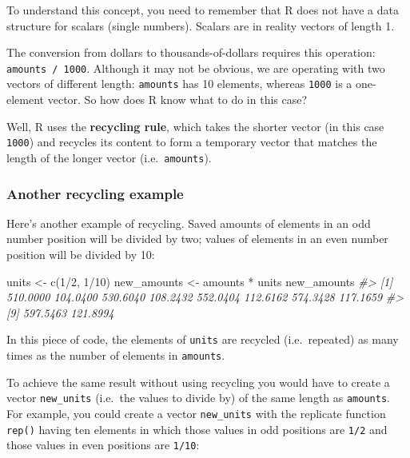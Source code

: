 \documentclass[
]{book}
\newenvironment{Shaded}{\begin{snugshade}}{\end{snugshade}}
\newcommand{\CommentTok}[1]{\textcolor[rgb]{0.56,0.35,0.01}{\textit{#1}}}
\newcommand{\DecValTok}[1]{\textcolor[rgb]{0.00,0.00,0.81}{#1}}
\newcommand{\FunctionTok}[1]{\textcolor[rgb]{0.00,0.00,0.00}{#1}}
\newcommand{\NormalTok}[1]{#1}
\newcommand{\OtherTok}[1]{\textcolor[rgb]{0.56,0.35,0.01}{#1}}
\newcommand{\SpecialCharTok}[1]{\textcolor[rgb]{0.00,0.00,0.00}{#1}}
\begin{document}
To understand this concept, you need to remember that R does not have a data
structure for scalars (single numbers). Scalars are in reality vectors of
length 1.

The conversion from dollars to thousands-of-dollars requires this operation:
\texttt{amounts\ /\ 1000}. Although it may not be obvious, we are operating with two
vectors of different length: \texttt{amounts} has 10 elements, whereas \texttt{1000} is a
one-element vector. So how does R know what to do in this case?

Well, R uses the \textbf{recycling rule}, which takes the shorter vector (in this
case \texttt{1000}) and recycles its content to form a temporary vector that matches
the length of the longer vector (i.e.~\texttt{amounts}).

\hypertarget{another-recycling-example}{%
\subsubsection*{Another recycling example}\label{another-recycling-example}}

Here's another example of recycling. Saved amounts of elements in an odd
number position will be divided by two; values of elements in an even
number position will be divided by 10:

\begin{Shaded}
\begin{Highlighting}[]
\NormalTok{units }\OtherTok{\textless{}{-}} \FunctionTok{c}\NormalTok{(}\DecValTok{1}\SpecialCharTok{/}\DecValTok{2}\NormalTok{, }\DecValTok{1}\SpecialCharTok{/}\DecValTok{10}\NormalTok{)}
\NormalTok{new\_amounts }\OtherTok{\textless{}{-}}\NormalTok{ amounts }\SpecialCharTok{*}\NormalTok{ units}
\NormalTok{new\_amounts}
\CommentTok{\#\textgreater{}  [1] 510.0000 104.0400 530.6040 108.2432 552.0404 112.6162 574.3428 117.1659}
\CommentTok{\#\textgreater{}  [9] 597.5463 121.8994}
\end{Highlighting}
\end{Shaded}

In this piece of code, the elements of \texttt{units} are recycled (i.e.~repeated) as
many times as the number of elements in \texttt{amounts}.

To achieve the same result without using recycling you would have to create a
vector \texttt{new\_units} (i.e.~the values to divide by) of the same length as \texttt{amounts}.
For example, you could create a vector \texttt{new\_units} with the replicate function
\texttt{rep()} having ten elements in which those values in odd positions are \texttt{1/2}
and those values in even positions are \texttt{1/10}:
\end{document}
